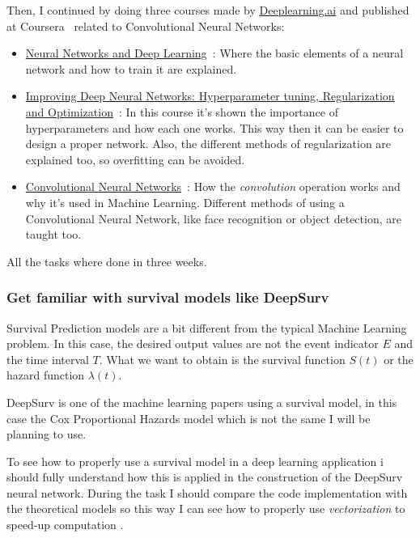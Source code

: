 Then, I continued by doing three courses made by \href{https://www.deeplearning.ai}{Deeplearning.ai}
and published at Coursera~\cite{neural:Coursera} related to Convolutional Neural Networks:
\begin{itemize}
  \item \href{https://www.coursera.org/learn/neural-networks-deep-learning}{Neural Networks and 
    Deep Learning}~\cite{neural:Coursera:NN}: Where the basic elements of a neural network and how
    to train it are explained.

  \item \href{https://www.coursera.org/learn/deep-neural-network}{Improving Deep Neural Networks: 
    Hyperparameter tuning, Regularization and Optimization}~\cite{neural:Coursera:NNHyperparameters}: 
    In this course it's shown the importance of hyperparameters and how each one works. 
    This way then it can be easier to design a proper network. Also, the different methods 
    of regularization are explained too, so overfitting can be avoided.

  \item \href{https://www.coursera.org/learn/convolutional-neural-networks}{Convolutional Neural 
    Networks}~\cite{neural:Coursera:CNN}:
    How the \emph{convolution} operation works and why it's used in Machine Learning. 
    Different methods of using a Convolutional Neural Network, like face recognition or 
    object detection, are taught too.
\end{itemize}

All the tasks where done in three weeks.

\subsubsection{Get familiar with survival models like DeepSurv}

Survival Prediction models are a bit different from the typical Machine Learning problem. 
In this case, the desired output values are not the event indicator \( E \) and the time
interval \( T \). What we want to obtain is the survival function \( S(t) \) or the 
hazard function \( \lambda(t) \).

DeepSurv is one of the machine learning papers using a survival model, in this case the
Cox Proportional Hazards model which is not the same I will be planning to use.

To see how to properly use a survival model in a deep learning application i should fully 
understand how this is applied in the construction of the DeepSurv neural network. During 
the task I should compare the code implementation with the theoretical models so this way
I can see how to properly use \emph{vectorization} to speed-up computation
\cites{medical:Cox}{medical:DeepSurv}.

